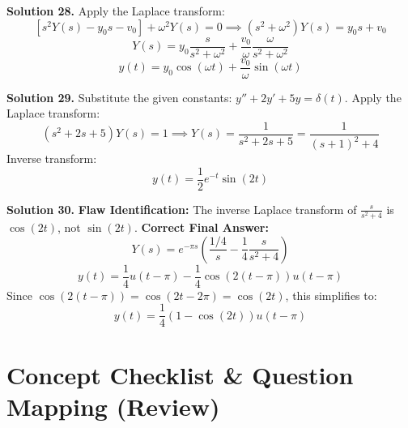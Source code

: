 \documentclass[11pt, letterpaper]{article}
\theoremstyle{definition}
\theoremstyle{remark}
\begin{document}
\vspace{1em}
\textbf{Solution 28.}
Apply the Laplace transform:
\[ [s^2 Y(s) - y_0 s - v_0] + \omega^2 Y(s) = 0 \implies (s^2 + \omega^2)Y(s) = y_0 s + v_0 \]
\[ Y(s) = y_0 \frac{s}{s^2 + \omega^2} + \frac{v_0}{\omega} \frac{\omega}{s^2 + \omega^2} \]
\[ y(t) = y_0 \cos(\omega t) + \frac{v_0}{\omega} \sin(\omega t) \]

\vspace{1em}
\textbf{Solution 29.}
Substitute the given constants: $y'' + 2y' + 5y = \delta(t)$.
Apply the Laplace transform:
\[ (s^2 + 2s + 5)Y(s) = 1 \implies Y(s) = \frac{1}{s^2 + 2s + 5} = \frac{1}{(s + 1)^2 + 4} \]
Inverse transform:
\[ y(t) = \frac{1}{2}e^{-t}\sin(2t) \]

\begin{center}
\end{center}

\vspace{1em}
\textbf{Solution 30.}
\textbf{Flaw Identification:} The inverse Laplace transform of $\frac{s}{s^2+4}$ is $\cos(2t)$, not $\sin(2t)$.
\textbf{Correct Final Answer:}
\[ Y(s) = e^{-\pi s} \left( \frac{1/4}{s} - \frac{1}{4}\frac{s}{s^2+4} \right) \]
\[ y(t) = \frac{1}{4} u(t-\pi) - \frac{1}{4} \cos(2(t-\pi)) u(t-\pi) \]
Since $\cos(2(t-\pi)) = \cos(2t - 2\pi) = \cos(2t)$, this simplifies to:
\[ y(t) = \frac{1}{4}(1 - \cos(2t))u(t-\pi) \]

\newpage

\section{Concept Checklist \& Question Mapping (Review)}
\end{document}
